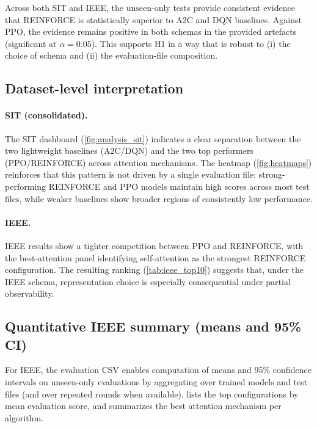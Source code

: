 \documentclass[11pt]{article}
\newcommand{\autorlTableRoot}{tables}
\renewcommand{\autorlTableRoot}{paper/tables}%
\begin{document}
\begin{table}[t]
	\centering
	\caption{Hypothesis tests for H1 (unseen-only evaluation score): one-tailed Welch $t$-tests comparing REINFORCE to each competitor at $\alpha=0.05$.}
	\label{tab:hyp_tests}
	
\end{table}

Across both SIT and IEEE, the unseen-only tests provide consistent evidence that \textsc{REINFORCE} is statistically superior to A2C and DQN baselines. Against PPO, the evidence remains positive in both schemas in the provided artefacts (significant at $\alpha=0.05$). This supports H1 in a way that is robust to (i) the choice of schema and (ii) the evaluation-file composition.

\subsection{Dataset-level interpretation}
\label{sec:dataset_interpretation}
\paragraph{SIT (consolidated).}
The SIT dashboard (\cref{fig:analysis_sit}) indicates a clear separation between the two lightweight baselines (A2C/DQN) and the two top performers (PPO/\textsc{REINFORCE}) across attention mechanisms. The heatmap (\cref{fig:heatmaps}) reinforces that this pattern is not driven by a single evaluation file: strong-performing \textsc{REINFORCE} and PPO models maintain high scores across most test files, while weaker baselines show broader regions of consistently low performance.

\paragraph{IEEE.}
IEEE results show a tighter competition between PPO and \textsc{REINFORCE}, with the best-attention panel identifying self-attention as the strongest \textsc{REINFORCE} configuration. The resulting ranking (\cref{tab:ieee_top10}) suggests that, under the IEEE schema, representation choice is especially consequential under partial observability.

\subsection{Quantitative IEEE summary (means and 95\% CI)}
\label{sec:ieee_summary}
For IEEE, the evaluation CSV enables computation of means and 95\% confidence intervals on unseen-only evaluations by aggregating over trained models and test files (and over repeated rounds when available).  lists the top configurations by mean evaluation score, and  summarizes the best attention mechanism per algorithm.
\end{document}
